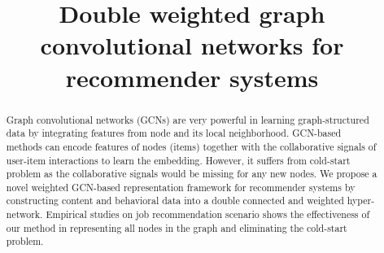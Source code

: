 \documentclass[manuscript,screen,review]{acmart}
\begin{document}
\title{Double weighted graph convolutional networks for recommender systems}

\renewcommand{\shortauthors}{Trovato and Tobin, et al.}

\begin{abstract}

Graph convolutional networks (GCNs) are very powerful in learning graph-structured data by integrating features from node and its local neighborhood. GCN-based methods can encode features of nodes (items) together with the collaborative signals of user-item interactions to learn the embedding. However, it suffers from cold-start problem as the collaborative signals would be missing for any new nodes. We propose a novel weighted GCN-based representation framework for recommender systems by constructing
content and behavioral data into a double connected and weighted hyper-network. Empirical studies on job recommendation scenario shows the effectiveness of our method in representing all nodes in the graph and eliminating the cold-start problem. 
\end{abstract}
\end{document}
